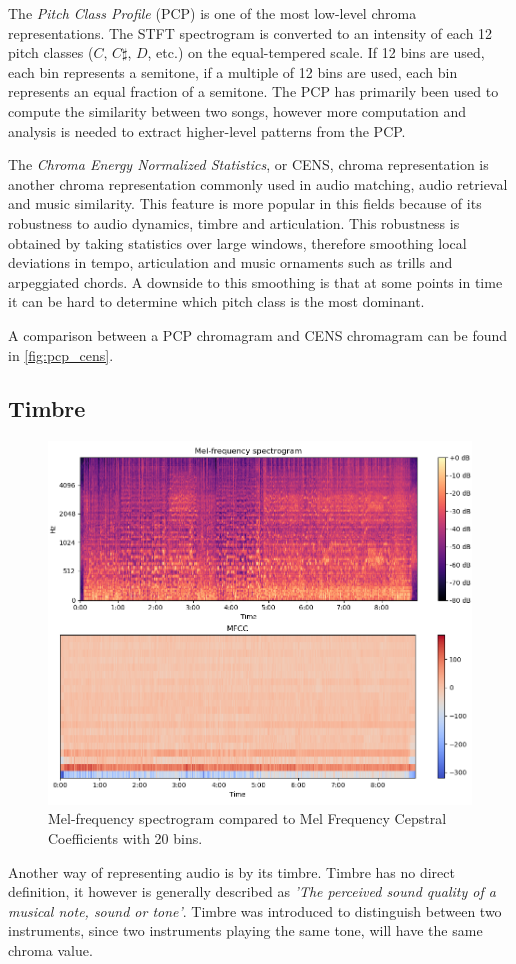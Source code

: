 The \textit{Pitch Class Profile} (PCP) \cite{Lee2006automatic} is one of the most low-level chroma representations. The STFT spectrogram is converted to an intensity of each 12 pitch classes ($C$, $C\sharp$, $D$, etc.) on the equal-tempered scale. If 12 bins are used, each bin represents a semitone, if a multiple of 12 bins are used, each bin represents an equal fraction of a semitone. The PCP has primarily been used to compute the similarity between two songs, however more computation and analysis is needed to extract higher-level patterns from the PCP.

The \textit{Chroma Energy Normalized Statistics}, or CENS, chroma representation \cite{Muller2005chroma} is another chroma representation commonly used in audio matching, audio retrieval and music similarity. This feature is more popular in this fields because of its robustness to audio dynamics, timbre and articulation. This robustness is obtained by taking statistics over large windows, therefore smoothing local deviations in tempo, articulation and music ornaments such as trills and arpeggiated chords. A downside to this smoothing is that at some points in time it can be hard to determine which pitch class is the most dominant.

A comparison between a PCP chromagram and CENS chromagram can be found in \autoref{fig:pcp_cens}.

\subsection{Timbre}
\begin{figure}[t]
    \centering
    \includegraphics[width=\textwidth]{images/mls_mfcc}
    \caption{Mel-frequency spectrogram compared to Mel Frequency Cepstral Coefficients with 20 bins.}
    \label{fig:mls_mfcc}
\end{figure}
Another way of representing audio is by its timbre. Timbre has no direct definition, it however is generally described as \textit{'The perceived sound quality of a musical note, sound or tone'}. Timbre was introduced to distinguish between two instruments, since two instruments playing the same tone, will have the same chroma value.

